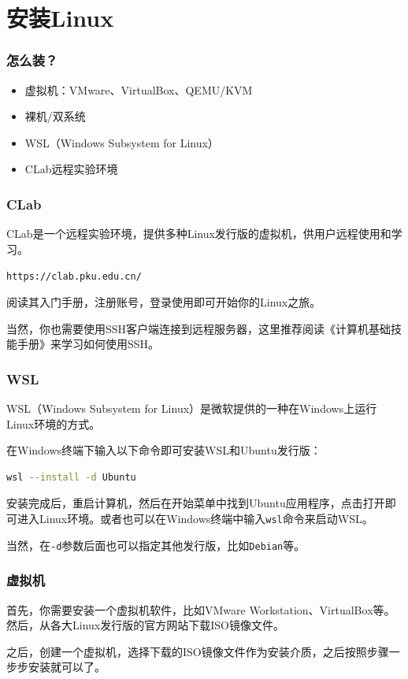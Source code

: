 \documentclass[aspectratio=1610]{ctexbeamer}
\begin{document}
\section{安装Linux}
\begin{frame}
    \frametitle{怎么装？}
    \begin{itemize}
        \item 虚拟机：VMware、VirtualBox、QEMU/KVM
        \item 裸机/双系统
        \item WSL（Windows Subsystem for Linux）
        \item CLab远程实验环境
    \end{itemize}
\end{frame}

\begin{frame}
    \frametitle{CLab}
    CLab是一个远程实验环境，提供多种Linux发行版的虚拟机，供用户远程使用和学习。

    \texttt{https://clab.pku.edu.cn/}

    阅读其入门手册，注册账号，登录使用即可开始你的Linux之旅。

    当然，你也需要使用SSH客户端连接到远程服务器，这里推荐阅读《计算机基础技能手册》来学习如何使用SSH。
\end{frame}

\begin{frame}[fragile]
    \frametitle{WSL}

    WSL（Windows Subsystem for Linux）是微软提供的一种在Windows上运行Linux环境的方式。

    在Windows终端下输入以下命令即可安装WSL和Ubuntu发行版：
    \begin{lstlisting}[language=bash]
wsl --install -d Ubuntu
    \end{lstlisting}
    安装完成后，重启计算机，然后在开始菜单中找到Ubuntu应用程序，点击打开即可进入Linux环境。或者也可以在Windows终端中输入\texttt{wsl}命令来启动WSL。

    当然，在\texttt{-d}参数后面也可以指定其他发行版，比如\texttt{Debian}等。
\end{frame}

\begin{frame}
    \frametitle{虚拟机}

    首先，你需要安装一个虚拟机软件，比如VMware Workstation、VirtualBox等。然后，从各大Linux发行版的官方网站下载ISO镜像文件。

    之后，创建一个虚拟机，选择下载的ISO镜像文件作为安装介质，之后按照步骤一步步安装就可以了。

\end{frame}
\end{document}
